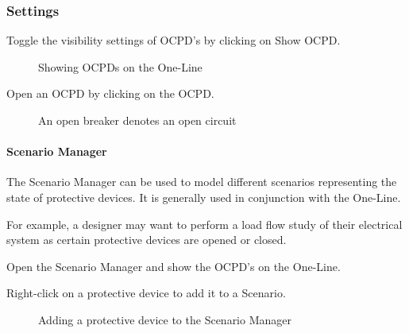 \documentclass[letterpaper,10pt,english]{sphinxmanual}
\begin{document}
\subsubsection{Settings}
\label{\detokenize{docs/userguide/buildingelectricalmodel/one-line/index-one-line:settings}}
Toggle the visibility settings of OCPD’s by clicking on Show OCPD.

\begin{figure}[H]
\centering
\capstart

\noindent{}
\caption{Showing OCPDs on the One-Line}\label{\detokenize{docs/userguide/buildingelectricalmodel/one-line/index-one-line:id31}}\end{figure}

Open an OCPD by clicking on the OCPD.

\begin{figure}[H]
\centering
\capstart

\noindent{}
\caption{An open breaker denotes an open circuit}\label{\detokenize{docs/userguide/buildingelectricalmodel/one-line/index-one-line:id32}}\end{figure}

\ignorespaces 
{}\ignorespaces 

\paragraph{Scenario Manager}
\label{\detokenize{docs/userguide/buildingelectricalmodel/one-line/index-one-line:scenario-manager}}\label{\detokenize{docs/userguide/buildingelectricalmodel/one-line/index-one-line:index-3}}\label{\detokenize{docs/userguide/buildingelectricalmodel/one-line/index-one-line:id1}}
The Scenario Manager can be used to model different scenarios representing the state of protective devices.  It is generally used in conjunction with the One-Line.

For example, a designer may want to perform a load flow study of their electrical system as certain protective devices are opened or closed.

Open the Scenario Manager and show the OCPD’s on the One-Line.

Right-click on a protective device to add it to a Scenario.

\begin{figure}[H]
\centering
\capstart

\noindent{}
\caption{Adding a protective device to the Scenario Manager}\label{\detokenize{docs/userguide/buildingelectricalmodel/one-line/index-one-line:id33}}\end{figure}
\end{document}
